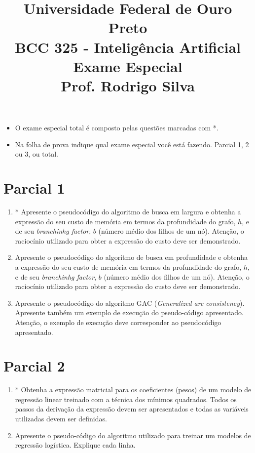 \documentclass{article}
\title{\vspace{-2 cm} Universidade Federal de Ouro Preto \\ BCC 325 - Inteligência Artificial \\ Exame Especial \\ Prof. Rodrigo Silva}
\date{}
\begin{document}
\maketitle

\vspace{-1 cm}

\begin{itemize}

    \item O exame especial total é composto pelas questões marcadas com *.
    
    \item Na folha de prova indique qual exame especial você está fazendo. Parcial 1, 2 ou 3, ou total.
\end{itemize}

\section{Parcial 1}

\begin{enumerate}
    \item * Apresente o pseudocódigo do algoritmo de busca em largura e obtenha a expressão do seu custo de memória em termos da profundidade do grafo, $h$, e de seu \textit{branchinhg factor}, $b$ (número médio dos filhos de um nó). Atenção, o raciocínio utilizado para obter a expressão do custo deve ser demonstrado. 
    
    \item Apresente o pseudocódigo do algoritmo de busca em profundidade e obtenha a expressão do seu custo de memória em termos da profundidade do grafo, $h$, e de seu \textit{branchinhg factor}, $b$ (número médio dos filhos de um nó). Atenção, o raciocínio utilizado para obter a expressão do custo deve ser demonstrado.
    
    \item Apresente o pseudocódigo do algoritmo GAC (\textit{Generalized arc consistency}). Apresente também um exemplo de execução do pseudo-código apresentado. Atenção, o exemplo de execução deve corresponder ao pseudocódigo apresentado.  

\end{enumerate}

\section{Parcial 2}


\begin{enumerate}
    \item * Obtenha a expressão matricial para os coeficientes (pesos) de um modelo de regressão linear treinado com a técnica dos mínimos quadrados. Todos os passos da derivação da expressão devem ser apresentados e todas as variáveis utilizadas devem ser definidas.
    
    \item Apresente o pseudo-código do algoritmo utilizado para treinar um modelos de regressão logística. Explique cada linha. 

\end{enumerate}
\end{document}
